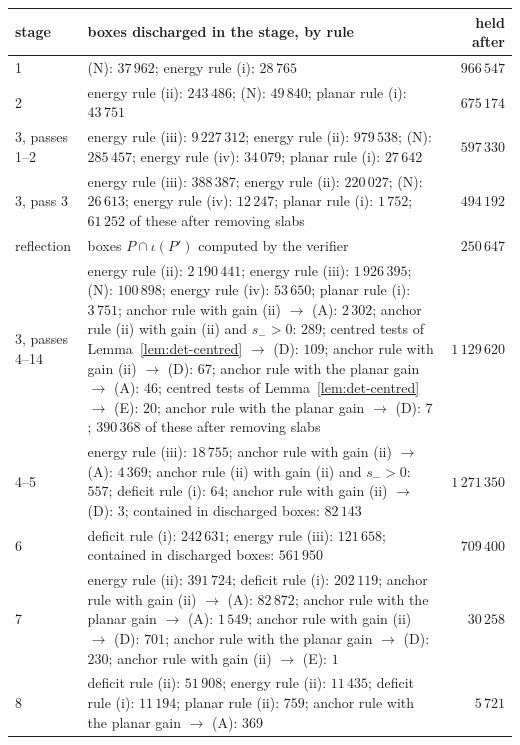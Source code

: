 \begin{table}[h]
\small
\begin{tabular}{l>{\raggedright\arraybackslash}p{}r}
\toprule
stage & boxes discharged in the stage, by rule & held after\\
\midrule
1 & (N): $37\,962$; energy rule (i): $28\,765$ & $966\,547$\\
2 & energy rule (ii): $243\,486$; (N): $49\,840$; planar rule (i): $43\,751$ & $675\,174$\\
3, passes 1--2 & energy rule (iii): $9\,227\,312$; energy rule (ii): $979\,538$; (N): $285\,457$; energy rule (iv): $34\,079$; planar rule (i): $27\,642$ & $597\,330$\\
3, pass 3 & energy rule (iii): $388\,387$; energy rule (ii): $220\,027$; (N): $26\,613$; energy rule (iv): $12\,247$; planar rule (i): $1\,752$; $61\,252$ of these after removing slabs & $494\,192$\\
reflection & boxes $P\cap\iota(P')$ computed by the verifier & $250\,647$\\
3, passes 4--14 & energy rule (ii): $2\,190\,441$; energy rule (iii): $1\,926\,395$; (N): $100\,898$; energy rule (iv): $53\,650$; planar rule (i): $3\,751$; anchor rule with gain (ii) $\to$ (A): $2\,302$; anchor rule (ii) with gain (ii) and $s_->0$: $289$; centred tests of Lemma~\ref{lem:det-centred} $\to$ (D): $109$; anchor rule with gain (ii) $\to$ (D): $67$; anchor rule with the planar gain $\to$ (A): $46$; centred tests of Lemma~\ref{lem:det-centred} $\to$ (E): $20$; anchor rule with the planar gain $\to$ (D): $7$; $390\,368$ of these after removing slabs & $1\,129\,620$\\
4--5 & energy rule (iii): $18\,755$; anchor rule with gain (ii) $\to$ (A): $4\,369$; anchor rule (ii) with gain (ii) and $s_->0$: $557$; deficit rule (i): $64$; anchor rule with gain (ii) $\to$ (D): $3$; contained in discharged boxes: $82\,143$ & $1\,271\,350$\\
6 & deficit rule (i): $242\,631$; energy rule (iii): $121\,658$; contained in discharged boxes: $561\,950$ & $709\,400$\\
7 & energy rule (ii): $391\,724$; deficit rule (i): $202\,119$; anchor rule with gain (ii) $\to$ (A): $82\,872$; anchor rule with the planar gain $\to$ (A): $1\,549$; anchor rule with gain (ii) $\to$ (D): $701$; anchor rule with the planar gain $\to$ (D): $230$; anchor rule with gain (ii) $\to$ (E): $1$ & $30\,258$\\
8 & deficit rule (ii): $51\,908$; energy rule (ii): $11\,435$; deficit rule (i): $11\,194$; planar rule (ii): $759$; anchor rule with the planar gain $\to$ (A): $369$ & $5\,721$\\

\end{tabular}
\end{table}
